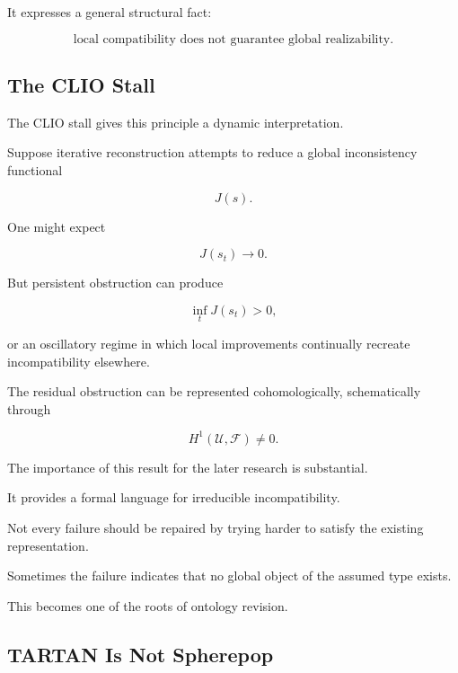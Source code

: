 \documentclass[11pt]{article}
\theoremstyle{remark}
\begin{document}
It expresses a general structural fact:

\begin{equation}
\boxed{
\text{local compatibility does not guarantee global realizability}.
}
\end{equation}

\subsection{The CLIO Stall}

The CLIO stall gives this principle a dynamic interpretation.

Suppose iterative reconstruction attempts to reduce a global inconsistency functional

\begin{equation}
J(s).
\end{equation}

One might expect

\begin{equation}
J(s_t)\rightarrow 0.
\end{equation}

But persistent obstruction can produce

\begin{equation}
\inf_t J(s_t)>0,
\end{equation}

or an oscillatory regime in which local improvements continually recreate incompatibility elsewhere.

The residual obstruction can be represented cohomologically, schematically through

\begin{equation}
H^1(\mathcal{U},\mathcal{F})\neq 0.
\end{equation}

The importance of this result for the later research is substantial.

It provides a formal language for irreducible incompatibility.

Not every failure should be repaired by trying harder to satisfy the existing representation.

Sometimes the failure indicates that no global object of the assumed type exists.

This becomes one of the roots of ontology revision.

\subsection{TARTAN Is Not Spherepop}
\end{document}
